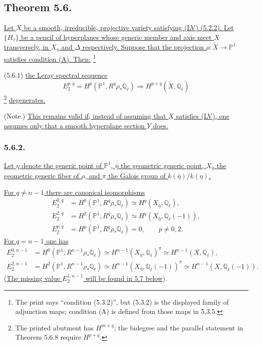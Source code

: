 \subsection*{Theorem 5.6.}
\underline{Let $X$ be a smooth, irreducible, projective variety satisfying
(LV) (5.2.2).  Let $\{H_\tau\}$ be a pencil of hyperplanes whose generic
member and axis meet $X$ transversely, in $X_\eta$ and $\Delta$ respectively.
Suppose that the projection
$\rho:\widetilde X\to\mathbb P^1$ satisfies condition (A).  Then:}
\footnote{The print says ``condition (5.3.2)'', but (5.3.2) is the displayed
family of adjunction maps; condition (A) is defined from those maps in 5.3.5.}

\smallskip
\noindent
\textup{(5.6.1)}\quad
\underline{the Leray spectral sequence}
\[
E_2^{p,q}=H^p(\mathbb P^1,R^q\rho_*\mathbb Q_\ell)
\Longrightarrow H^{p+q}(\widetilde X,\mathbb Q_\ell)
\]
\footnote{The printed abutment has $H^{m+q}$; the bidegree and the parallel
statement in Theorem 5.6.8 require $H^{p+q}$.}
\underline{degenerates.}

\noindent
\textup{(Note.)}\quad
\underline{This remains valid if, instead of assuming that $X$ satisfies
(LV), one assumes only that a smooth hyperplane section $Y$ does.}

\subsubsection*{5.6.2.}
\underline{Let $\eta$ denote the generic point of $\mathbb P^1$,
$\bar\eta$ the geometric generic point, $X_{\bar\eta}$ the geometric generic
fiber of $\rho$, and $\pi$ the Galois group of
$k(\bar\eta)/k(\eta)$.}

\underline{For $q\neq n-1$ there are canonical isomorphisms}
\begin{align}
E_2^{0,q}
 &=H^0(\mathbb P^1,R^q\rho_*\mathbb Q_\ell)
 \simeq H^q(X_{\bar\eta},\mathbb Q_\ell),
 \tag{5.6.2.1}\\
E_2^{2,q}
 &=H^2(\mathbb P^1,R^q\rho_*\mathbb Q_\ell)
 \simeq H^q(X_{\bar\eta},\mathbb Q_\ell(-1)),
 \tag{5.6.2.2}\\
E_2^{p,q}
 &=H^p(\mathbb P^1,R^q\rho_*\mathbb Q_\ell)=0,
 \qquad p\neq0,2.
 \tag{5.6.2.3}
\end{align}
\underline{For $q=n-1$ one has}
\begin{align}
E_2^{0,n-1}
 &=H^0(\mathbb P^1,R^{n-1}\rho_*\mathbb Q_\ell)
 \simeq H^{n-1}(X_{\bar\eta},\mathbb Q_\ell)^\pi
 \simeq H^{n-1}(X,\mathbb Q_\ell),
 \tag{5.6.2.4}\\
E_2^{2,n-1}
 &=H^2(\mathbb P^1,R^{n-1}\rho_*\mathbb Q_\ell)
 \simeq H^{n-1}(X_{\bar\eta},\mathbb Q_\ell(-1))^\pi
 \simeq H^{n-1}(X,\mathbb Q_\ell(-1)).
 \tag{5.6.2.5}
\end{align}
(\underline{The missing value $E_2^{1,n-1}$ will be found in 5.7 below}).

